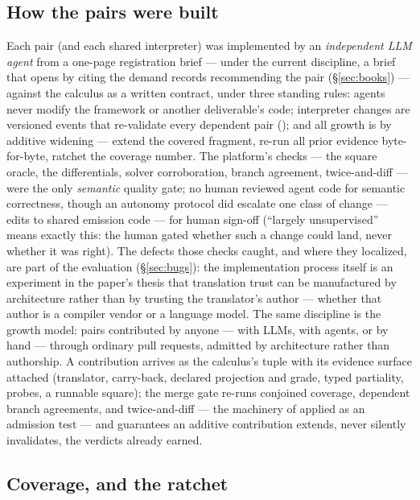 \subsection{How the pairs were built}
\label{sec:agents}
Each pair (and each shared interpreter) was implemented by an
\emph{independent LLM agent} from a one-page registration brief ---
under the current discipline, a brief that opens by citing the demand
records recommending the pair (\S\ref{sec:books}) --- against
the calculus as a written contract, under three standing rules: agents
never modify the framework or another deliverable's code; interpreter
changes are versioned events that re-validate every dependent pair
(); and all growth is by additive widening --- extend
the covered fragment, re-run all prior evidence byte-for-byte, ratchet
the coverage number. The platform's checks --- the square oracle, the
differentials, solver corroboration, branch agreement, twice-and-diff ---
were the only \emph{semantic} quality gate; no human reviewed agent code
for semantic correctness, though an autonomy protocol did escalate one
class of change --- edits to shared emission code --- for human sign-off
(``largely unsupervised'' means exactly this: the human gated whether
such a change could land, never whether it was right).
The defects those checks caught, and where they localized,
are part of the evaluation (\S\ref{sec:bugs}): the implementation process
itself is an experiment in the paper's thesis that translation trust can
be manufactured by architecture rather than by trusting the translator's
author --- whether that author is a compiler vendor or a language model.
The same discipline is the growth model: pairs contributed by anyone
--- with LLMs, with agents, or by hand --- through ordinary pull
requests, admitted by architecture rather than authorship. A
contribution arrives as the calculus's tuple with its evidence surface
attached (translator, carry-back, declared projection and grade, typed
\unsupported{} partiality, probes, a runnable square); the merge gate
re-runs conjoined coverage, dependent branch agreements, and
twice-and-diff --- the machinery of  applied as
an admission test --- and  guarantees an additive
contribution extends, never silently invalidates, the verdicts already
earned.

\subsection{Coverage, and the ratchet}
\label{sec:coverage}

